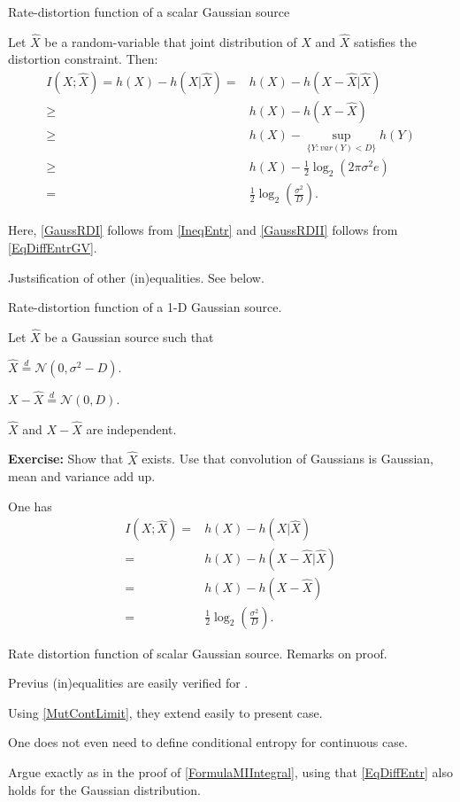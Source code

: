 \begin{frame}{Rate-distortion function of a scalar Gaussian source}
\bit
\item Let $\hat{X}$ be a random-variable that joint distribution of $X$ and $\hat{X}$ satisfies the distortion constraint. Then: 
\begin{align}
I(X;\hat{X})=h(X)-h(X|\hat{X})
= & h(X)-h(X-\hat{X}|\hat{X})\nonumber\\
\geq & h(X)- h(X-\hat{X})\nonumber\\
\geq & h(X) - \sup_{\{Y\colon var(Y)<D\}}h(Y)\nonumber\\
\geq & h(X) - \frac{1}{2}\log_2(2\pi\sigma^2 e)\label{GaussRDI}\\
=& \frac{1}{2}\log_2\left(\frac{\sigma^2}{D}\right)\label{GaussRDII}. 
\end{align}
\item Here, \eqref{GaussRDI} follows from \eqref{IneqEntr} and \eqref{GaussRDII} follows from \eqref{EqDiffEntrGV}. 
\item Justsification of other (in)equalities. See below. 
\eit

\end{frame}




\begin{frame}{Rate-distortion function of a 1-D Gaussian source.}
\bit
\item Let $\hat{X}$ be a Gaussian source such that
\bit
\item $\hat{X}\stackrel{d}{=} \mathcal{N}(0,\sigma^2-D)$.
\item $X-\hat{X}\stackrel{d}{=} \mathcal{N}(0,D)$.
\item $\hat{X}$ and $X-\hat{X}$ are independent.
\eit
\item \textbf{Exercise: } Show that $\hat{X}$ exists. Use that convolution of Gaussians is Gaussian, mean and variance add up. 
\item One has
\begin{align*}
I(X;\hat{X})=&h(X)-h(X|\hat{X})\\
=&h(X)-h(X-\hat{X}|\hat{X})\\
=&h(X)-h(X-\hat{X})\\
=& \frac{1}{2}\log_2\left(\frac{\sigma^2}{D}\right).
\end{align*}
\eit
\end{frame}

\begin{frame}{Rate distortion function of scalar Gaussian source. Remarks on proof.}
\bit
\item  Previus (in)equalities are easily verified for . 
\item Using \eqref{MutContLimit},  they extend easily to present case. 
\item One does not even need to define conditional entropy for continuous case.
\item  Argue exactly as in the proof of \eqref{FormulaMIIntegral}, using that \eqref{EqDiffEntr} also holds for the Gaussian distribution. 
\eit
\end{frame}

